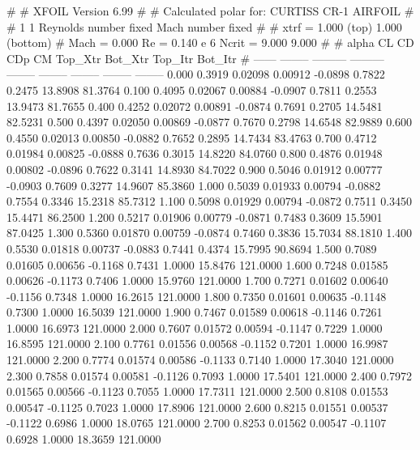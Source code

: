 #  
#       XFOIL         Version 6.99
#  
# Calculated polar for: CURTISS CR-1 AIRFOIL                            
#  
# 1 1 Reynolds number fixed          Mach number fixed         
#  
# xtrf =   1.000 (top)        1.000 (bottom)  
# Mach =   0.000     Re =     0.140 e 6     Ncrit =   9.000  9.000
#  
#   alpha    CL        CD       CDp       CM     Top_Xtr  Bot_Xtr  Top_Itr  Bot_Itr
#  ------ -------- --------- --------- -------- -------- -------- -------- --------
   0.000   0.3919   0.02098   0.00912  -0.0898   0.7822   0.2475  13.8908  81.3764
   0.100   0.4095   0.02067   0.00884  -0.0907   0.7811   0.2553  13.9473  81.7655
   0.400   0.4252   0.02072   0.00891  -0.0874   0.7691   0.2705  14.5481  82.5231
   0.500   0.4397   0.02050   0.00869  -0.0877   0.7670   0.2798  14.6548  82.9889
   0.600   0.4550   0.02013   0.00850  -0.0882   0.7652   0.2895  14.7434  83.4763
   0.700   0.4712   0.01984   0.00825  -0.0888   0.7636   0.3015  14.8220  84.0760
   0.800   0.4876   0.01948   0.00802  -0.0896   0.7622   0.3141  14.8930  84.7022
   0.900   0.5046   0.01912   0.00777  -0.0903   0.7609   0.3277  14.9607  85.3860
   1.000   0.5039   0.01933   0.00794  -0.0882   0.7554   0.3346  15.2318  85.7312
   1.100   0.5098   0.01929   0.00794  -0.0872   0.7511   0.3450  15.4471  86.2500
   1.200   0.5217   0.01906   0.00779  -0.0871   0.7483   0.3609  15.5901  87.0425
   1.300   0.5360   0.01870   0.00759  -0.0874   0.7460   0.3836  15.7034  88.1810
   1.400   0.5530   0.01818   0.00737  -0.0883   0.7441   0.4374  15.7995  90.8694
   1.500   0.7089   0.01605   0.00656  -0.1168   0.7431   1.0000  15.8476 121.0000
   1.600   0.7248   0.01585   0.00626  -0.1173   0.7406   1.0000  15.9760 121.0000
   1.700   0.7271   0.01602   0.00640  -0.1156   0.7348   1.0000  16.2615 121.0000
   1.800   0.7350   0.01601   0.00635  -0.1148   0.7300   1.0000  16.5039 121.0000
   1.900   0.7467   0.01589   0.00618  -0.1146   0.7261   1.0000  16.6973 121.0000
   2.000   0.7607   0.01572   0.00594  -0.1147   0.7229   1.0000  16.8595 121.0000
   2.100   0.7761   0.01556   0.00568  -0.1152   0.7201   1.0000  16.9987 121.0000
   2.200   0.7774   0.01574   0.00586  -0.1133   0.7140   1.0000  17.3040 121.0000
   2.300   0.7858   0.01574   0.00581  -0.1126   0.7093   1.0000  17.5401 121.0000
   2.400   0.7972   0.01565   0.00566  -0.1123   0.7055   1.0000  17.7311 121.0000
   2.500   0.8108   0.01553   0.00547  -0.1125   0.7023   1.0000  17.8906 121.0000
   2.600   0.8215   0.01551   0.00537  -0.1122   0.6986   1.0000  18.0765 121.0000
   2.700   0.8253   0.01562   0.00547  -0.1107   0.6928   1.0000  18.3659 121.0000
